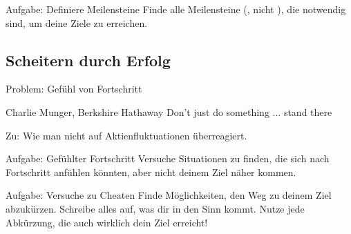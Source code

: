 \begin{frame}[c]
    \begin{block}{Aufgabe: Definiere Meilensteine}
        Finde alle Meilensteine (, nicht ), die
        notwendig sind, um deine Ziele zu erreichen.
    \end{block}
\end{frame}


%
%
%


\subsection{Scheitern durch Erfolg}

\begin{frame}[c]{Problem: Gefühl von Fortschritt}
    \large
    \begin{aquote}{Charlie Munger, Berkshire Hathaway}
        Don’t just do something ... stand there
    \end{aquote}
    \normalsize
    Zu: Wie man nicht auf Aktienfluktuationen überreagiert.
\end{frame}


\begin{frame}[c]
    \vspace{1cm}
    \begin{block}{Aufgabe: Gefühlter Fortschritt}
        Versuche Situationen zu finden, die sich nach Fortschritt anfühlen
        könnten, aber nicht deinem Ziel näher kommen.
    \end{block}
    \vspace{0.5cm}
    \begin{block}{Aufgabe: Versuche zu Cheaten}
        Finde Möglichkeiten, den Weg zu deinem Ziel abzukürzen. Schreibe
        alles auf, was dir in den Sinn kommt. Nutze jede Abkürzung, die auch
        wirklich dein Ziel erreicht!
    \end{block}
\end{frame}


